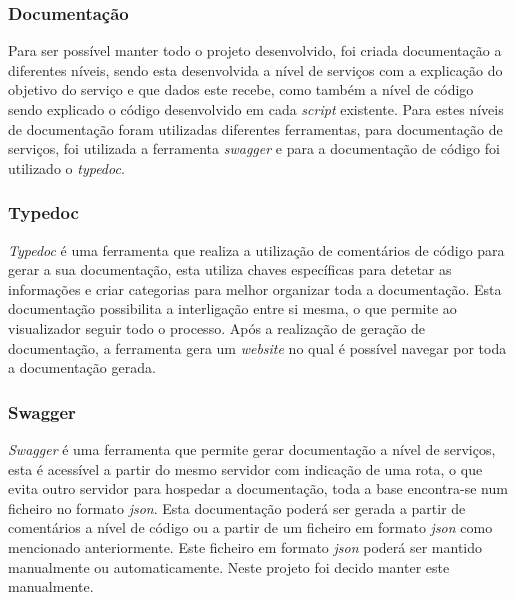 \subsubsection{Documentação}
Para ser possível manter todo o projeto desenvolvido, foi criada documentação a diferentes níveis, sendo esta desenvolvida a nível de serviços com a explicação do objetivo do serviço e que dados este recebe, como também a nível de código sendo explicado o código desenvolvido em cada \textit{script} existente. Para estes níveis de documentação foram utilizadas diferentes ferramentas, para documentação de serviços, foi utilizada a ferramenta \textit{swagger} e para a documentação de código foi utilizado o \textit{typedoc}.

\subsubsection{Typedoc}

\textit{Typedoc} é uma ferramenta que realiza a utilização de comentários de código para gerar a sua documentação, esta utiliza chaves específicas para detetar as informações e criar categorias para melhor organizar toda a documentação. Esta documentação possibilita a interligação entre si mesma, o que permite ao visualizador seguir todo o processo. Após a realização de geração de documentação, a ferramenta gera um \textit{website} no qual é possível navegar por toda a documentação gerada.

\newpage

\subsubsection{Swagger}

\textit{Swagger} é uma ferramenta que permite gerar documentação a nível de serviços, esta é acessível a partir do mesmo servidor com indicação de uma rota, o que evita outro servidor para hospedar a documentação, toda a base encontra-se num ficheiro no formato \textit{json}. Esta documentação poderá ser gerada a partir de comentários a nível de código ou a partir de um ficheiro em formato \textit{json} como mencionado anteriormente. Este ficheiro em formato \textit{json} poderá ser mantido manualmente ou automaticamente. Neste projeto foi decido manter este manualmente.